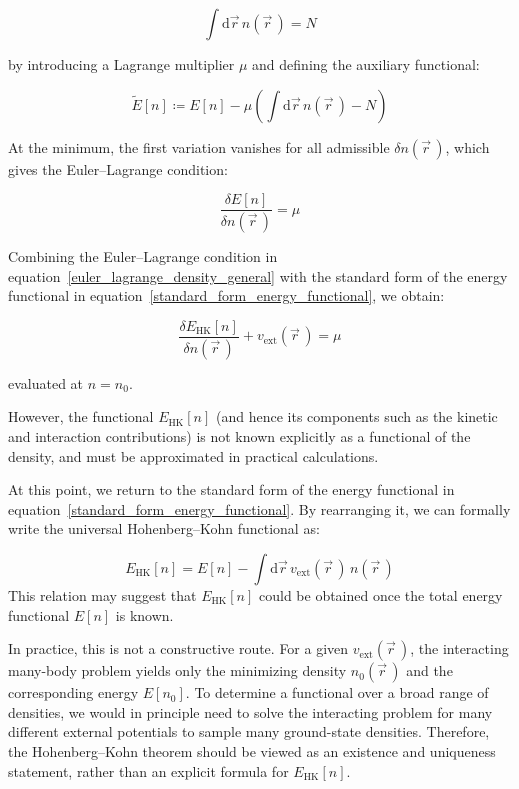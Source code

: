 \begin{equation}
    \int \mathrm{d}\vec{r}\, n(\vec{r}\,) = N
\label{particle_number_constraint}
\end{equation}

by introducing a Lagrange multiplier $\mu$ and defining the auxiliary functional:

\begin{equation}
    \widetilde{E}[n]\coloneqq E[n]-\mu\left(\int\mathrm{d}\vec{r}\,n(\vec{r}\,)-N\right)
\label{lagrangian_functional_density}
\end{equation}

At the minimum, the first variation vanishes for all admissible $\delta n(\vec{r}\,)$, which gives the Euler--Lagrange condition:

\begin{equation}
    \frac{\delta E[n]}{\delta n(\vec{r}\,)} = \mu
\label{euler_lagrange_density_general}
\end{equation}

Combining the Euler--Lagrange condition in equation~\eqref{euler_lagrange_density_general} with the standard form of the energy functional in equation~\eqref{standard_form_energy_functional}, we obtain:

\begin{equation}
    \frac{\delta E_\mathrm{HK}[n]}{\delta n(\vec{r}\,)} + v_\mathrm{ext}(\vec{r}\,) = \mu
\label{euler_lagrange_density_functional}
\end{equation}

evaluated at $n=n_0$.

However, the functional $E_\mathrm{HK}[n]$ (and hence its components such as the kinetic and interaction contributions)
is not known explicitly as a functional of the density, and must be approximated in practical calculations.

At this point, we return to the standard form of the energy functional in equation~\eqref{standard_form_energy_functional}. By rearranging it, we can formally write the universal Hohenberg--Kohn functional as:

\begin{equation}
    E_\mathrm{HK}[n] = E[n]-\int\mathrm{d}\vec{r}\,v_\mathrm{ext}(\vec{r}\,)\,n(\vec{r}\,)
\label{formal_FHK_as_difference}
\end{equation}
This relation may suggest that $E_\mathrm{HK}[n]$ could be obtained once the total energy functional $E[n]$ is known.

In practice, this is not a constructive route.
For a given $v_\mathrm{ext}(\vec{r}\,)$, the interacting many-body problem yields only the minimizing density $n_0(\vec{r}\,)$ and the corresponding energy $E[n_0]$.
To determine a functional over a broad range of densities, we would in principle need to solve the interacting problem for many different external potentials to sample many ground-state densities.
Therefore, the Hohenberg--Kohn theorem should be viewed as an existence and uniqueness statement, rather than an explicit formula for $E_\mathrm{HK}[n]$. 

